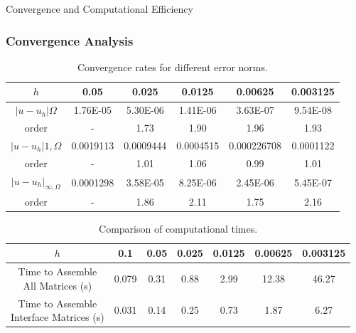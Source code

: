 \documentclass[notheorems,serif]{beamer}
\begin{document}
\begin{CJK}{UTF8}{gkai}
\begin{frame}{Convergence and Computational Efficiency}
\frametitle{Convergence Analysis}
\small{
\begin{table}[h]
\centering
\caption{Convergence rates for different error norms.}
\begin{tabular}{|c|c|c|c|c|c|}
\hline
$h$ & 0.05 & 0.025 & 0.0125 & 0.00625 & 0.003125 \\
\hline
$|u-u_h|{\Omega}$ & 1.76E-05 & 5.30E-06 & 1.41E-06 & 3.63E-07 &
9.54E-08 \\
\hline
$\mathrm{order}$ & - & 1.73 & 1.90 & 1.96 & 1.93 \\
\hline
$|u-u_h|{1, \Omega}$ & 0.0019113 & 0.0009444 & 0.0004515 &
0.000226708 & 0.0001122 \\
\hline
$\mathrm{order}$ & - & 1.01 & 1.06 & 0.99 & 1.01 \\
\hline
$|u-u_h|_{\infty,\Omega}$ & 0.0001298 & 3.58E-05 & 8.25E-06 &
2.45E-06 & 5.45E-07 \\
\hline
$\mathrm{order}$ & - & 1.86 & 2.11 & 1.75 & 2.16 \\
\hline
\end{tabular}
\end{table}


\begin{table}[h]
\centering
\caption{Comparison of computational times.}
\begin{tabular}{|c|c|c|c|c|c|c|}
\hline
$h$ & 0.1 & 0.05 & 0.025 & 0.0125 & 0.00625 & 0.003125 \\
\hline
\makecell{Time to Assemble \\ All Matrices (s)} & 0.079 & 0.31 & 0.88 & 2.99 & 12.38 & 46.27 \\
\hline
\makecell{Time to Assemble \\ Interface Matrices (s)} & 0.031 & 0.14 & 0.25 & 0.73 & 1.87 & 6.27 \\
\hline
\end{tabular}
\end{table}
}
\end{frame}


\end{CJK}
\end{document}

